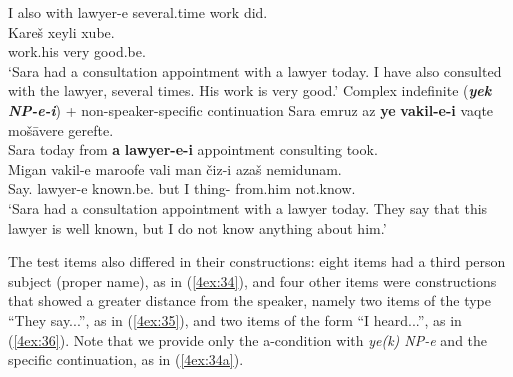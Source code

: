 \documentclass[output=paper]{langsci/langscibook}
\begin{document}
\begin{exe}
\begin{xlista}
		I       also with	lawyer-e several.time work did.{}  \\
	\glt	
	\exi{}
	\gll	Kareš   xeyli	xube. \\
		work.his very	good.be.{} \\
	\glt	`Sara had a consultation appointment with a lawyer today. I have also consulted with the lawyer, several times. His work is very good.'
	\ex\label{4ex:34d}
	Complex indefinite ({\bf\emph{yek NP-e-i}}) + non-speaker-specific continuation
	\exi{}
	\gll	Sara emruz az     {\bf{ye}} {\bf{vakil-e-i}}     vaqte 	           mošāvere gerefte. \\
		Sara  today from {\bf{a}}   {\bf{lawyer-e-i}}  appointment consulting  took.{} \\
	\glt
	\exi{}
	\gll	Migan    vakil-e	 maroofe	       vali	man čiz-i		       azaš      nemidunam. \\
		Say.{} lawyer-e known.be.{} but	I	   thing-{} from.him not.know.{} \\
	\glt	`{Sara had a consultation appointment with a lawyer today. They say that this lawyer is well known, but I do not know anything about him.}'
	\end{xlista}
\end{exe}

The test items also differed in their constructions: eight items had a third person subject (proper name), as in (\ref{4ex:34}), and four other items were constructions that showed a greater distance from the speaker, namely two items of the type ``They say...'', as in (\ref{4ex:35}), and two items of the form ``I heard...'', as in (\ref{4ex:36}). Note that we provide only the a-condition with {\emph{ye(k) NP-e}} and the specific continuation, as in (\ref{4ex:34a}).
\end{document}

